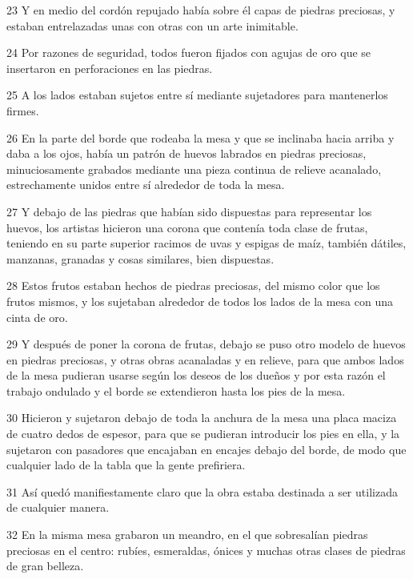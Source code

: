 \par 23 Y en medio del cordón repujado había sobre él capas de piedras preciosas, y estaban entrelazadas unas con otras con un arte inimitable.

\par 24 Por razones de seguridad, todos fueron fijados con agujas de oro que se insertaron en perforaciones en las piedras.

\par 25 A los lados estaban sujetos entre sí mediante sujetadores para mantenerlos firmes.

\par 26 En la parte del borde que rodeaba la mesa y que se inclinaba hacia arriba y daba a los ojos, había un patrón de huevos labrados en piedras preciosas, minuciosamente grabados mediante una pieza continua de relieve acanalado, estrechamente unidos entre sí alrededor de toda la mesa.

\par 27 Y debajo de las piedras que habían sido dispuestas para representar los huevos, los artistas hicieron una corona que contenía toda clase de frutas, teniendo en su parte superior racimos de uvas y espigas de maíz, también dátiles, manzanas, granadas y cosas similares, bien dispuestas.

\par 28 Estos frutos estaban hechos de piedras preciosas, del mismo color que los frutos mismos, y los sujetaban alrededor de todos los lados de la mesa con una cinta de oro.

\par 29 Y después de poner la corona de frutas, debajo se puso otro modelo de huevos en piedras preciosas, y otras obras acanaladas y en relieve, para que ambos lados de la mesa pudieran usarse según los deseos de los dueños y por esta razón el trabajo ondulado y el borde se extendieron hasta los pies de la mesa.

\par 30 Hicieron y sujetaron debajo de toda la anchura de la mesa una placa maciza de cuatro dedos de espesor, para que se pudieran introducir los pies en ella, y la sujetaron con pasadores que encajaban en encajes debajo del borde, de modo que cualquier lado de la tabla que la gente prefiriera.

\par 31 Así quedó manifiestamente claro que la obra estaba destinada a ser utilizada de cualquier manera.

\par 32 En la misma mesa grabaron un meandro, en el que sobresalían piedras preciosas en el centro: rubíes, esmeraldas, ónices y muchas otras clases de piedras de gran belleza.

